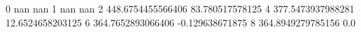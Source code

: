 0 nan nan
1 nan nan
2 448.6754455566406 83.780517578125
4 377.5473937988281 12.6524658203125
6 364.7652893066406 -0.129638671875
8 364.8949279785156 0.0
